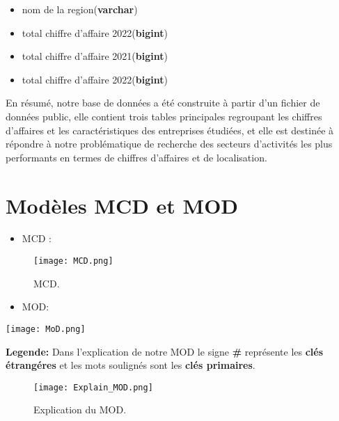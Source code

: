 \documentclass[mstat,12pt]{unswthesis}
\begin{document}
\begin{itemize}
  \begin{itemize}
  \tightlist
  \item
    nom de la region(\textbf{varchar})
  \item
    total chiffre d'affaire 2022(\textbf{bigint})
  \item
    total chiffre d'affaire 2021(\textbf{bigint})
  \item
    total chiffre d'affaire 2022(\textbf{bigint})
  \end{itemize}
\end{itemize}

En résumé, notre base de données a été construite à partir d'un fichier
de données public, elle contient trois tables principales regroupant les
chiffres d'affaires et les caractéristiques des entreprises étudiées, et
elle est destinée à répondre à notre problématique de recherche des
secteurs d'activités les plus performants en termes de chiffres
d'affaires et de localisation.

\hypertarget{moduxe8les-mcd-et-mod}{%
\section{Modèles MCD et MOD}\label{moduxe8les-mcd-et-mod}}

\begin{itemize}
\tightlist
\item
  MCD :
\end{itemize}

\begin{figure}
\hypertarget{uml}{%
\centering
\texttt{[image: MCD.png]}
\caption{MCD.}\label{uml}
}
\end{figure}

\begin{itemize}
\tightlist
\item
  MOD:
\end{itemize}

\texttt{[image: MoD.png]} \bigskip

\textbf{Legende:} Dans l'explication de notre MOD le signe \textbf{\#}
représente les \textbf{clés étrangéres} et les mots soulignés sont les
\textbf{clés primaires}.

\begin{figure}
\hypertarget{uml}{%
\centering
\texttt{[image: Explain\_MOD.png]}
\caption{Explication du MOD.}\label{uml}
}
\end{figure}
\end{document}
